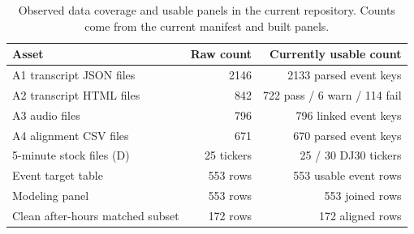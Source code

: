 
\begin{table}[t]
\caption{Observed data coverage and usable panels in the current repository. Counts come from the current manifest and built panels.}
\label{tab:data-assets}
\begin{tabularx}{\columnwidth}{lrr}
\toprule
Asset & Raw count & Currently usable count \\
\midrule
A1 transcript JSON files & 2146 & 2133 parsed event keys \\
A2 transcript HTML files & 842 & 722 pass / 6 warn / 114 fail \\
A3 audio files & 796 & 796 linked event keys \\
A4 alignment CSV files & 671 & 670 parsed event keys \\
5-minute stock files (D) & 25 tickers & 25 / 30 DJ30 tickers \\
Event target table & 553 rows & 553 usable event rows \\
Modeling panel & 553 rows & 553 joined rows \\
Clean after-hours matched subset & 172 rows & 172 aligned rows \\
\bottomrule
\end{tabularx}
\end{table}
